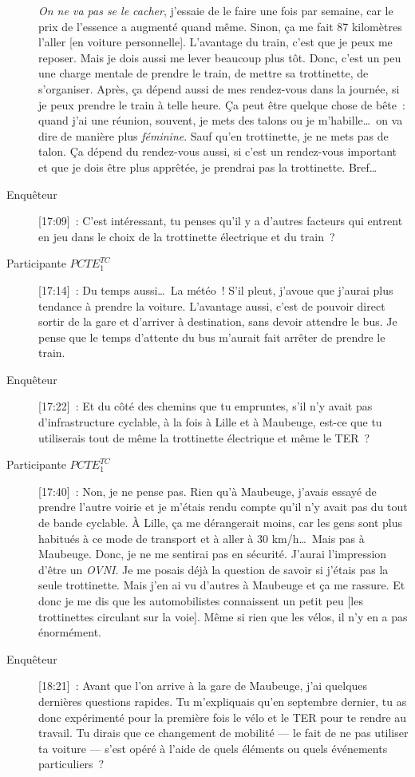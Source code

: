 \begin{description}
    \textsl{On ne va pas se le cacher}, j’essaie de le faire une fois par semaine, car le prix de l’essence a augmenté quand même. Sinon, ça me fait 87 kilomètres l'aller [en voiture personnelle]. L’avantage du train, c’est que je peux me reposer. Mais je dois aussi me lever beaucoup plus tôt. Donc, c’est un peu une charge mentale de prendre le train, de mettre sa trottinette, de s’organiser. Après, ça dépend aussi de mes rendez-vous dans la journée, si je peux prendre le train à telle heure. Ça peut être quelque chose de bête~: quand j’ai une réunion, souvent, je mets des talons ou je m’habille\dots~on va dire de manière plus \textsl{féminine}. Sauf qu’en trottinette, je ne mets pas de talon. Ça dépend du rendez-vous aussi, si c’est un rendez-vous important et que je dois être plus apprêtée, je prendrai pas la trottinette. Bref\dots~
    \item[Enquêteur] [17:09]~: C'est intéressant, tu penses qu'il y a d'autres facteurs qui entrent en jeu dans le choix de la trottinette électrique et du train~?
    \item[Participante \(PCTE^{TC}_{1}\)] [17:14]~: Du temps aussi\dots~La météo~! S'il pleut, j'avoue que j'aurai plus tendance à prendre la voiture. L'avantage aussi, c'est de pouvoir direct sortir de la gare et d'arriver à destination, sans devoir attendre le bus. Je pense que le temps d'attente du bus m'aurait fait arrêter de prendre le train.
    \item[Enquêteur] [17:22]~: Et du côté des chemins que tu empruntes, s'il n'y avait pas d'infrastructure cyclable, à la fois à Lille et à Maubeuge, est-ce que tu utiliserais tout de même la trottinette électrique et même le TER~?
    \item[Participante \(PCTE^{TC}_{1}\)] [17:40]~: Non, je ne pense pas. Rien qu’à Maubeuge, j’avais essayé de prendre l’autre voirie et je m’étais rendu compte qu’il n’y avait pas du tout de bande cyclable. À Lille, ça me dérangerait moins, car les gens sont plus habitués à ce mode de transport et à aller à 30 km/h\dots~Mais pas à Maubeuge. Donc, je ne me sentirai pas en sécurité. J’aurai l’impression d’être un \textsl{OVNI}. Je me posais déjà la question de savoir si j'étais pas la seule trottinette. Mais j’en ai vu d’autres à Maubeuge et ça me rassure. Et donc je me dis que les automobilistes connaissent un petit peu [les trottinettes circulant sur la voie]. Même si rien que les vélos, il n’y en a pas énormément. 
    \item[Enquêteur] [18:21]~: Avant que l'on arrive à la gare de Maubeuge, j'ai quelques dernières questions rapides. Tu m'expliquais qu'en septembre dernier, tu as donc expérimenté pour la première fois le vélo et le TER pour te rendre au travail. Tu dirais que ce changement de mobilité — le fait de ne pas utiliser ta voiture — s'est opéré à l'aide de quels éléments ou quels événements particuliers~?

\end{description}
